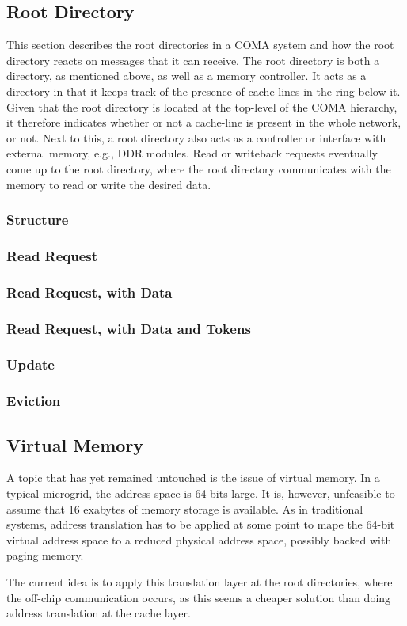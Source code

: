 \subsection{Root Directory}
This section describes the root directories in a COMA system and how the root directory reacts on messages that it can receive. The root directory is both a directory, as mentioned above, as well as a memory controller. It acts as a directory in that it keeps track of the presence of cache-lines in the ring below it. Given that the root directory is located at the top-level of the COMA hierarchy, it therefore indicates whether or not a cache-line is present in the whole network, or not. Next to this, a root directory also acts as a controller or interface with external memory, e.g., DDR modules. Read or writeback requests eventually come up to the root directory, where the root directory communicates with the memory to read or write the desired data.

\subsubsection{Structure}
\subsubsection{Read Request}
\subsubsection{Read Request, with Data}
\subsubsection{Read Request, with Data and Tokens}
\subsubsection{Update}
\subsubsection{Eviction}

\subsection{Virtual Memory}
A topic that has yet remained untouched is the issue of virtual memory. In a typical microgrid, the address space is 64-bits large. It is, however, unfeasible to assume that 16 exabytes of memory storage is available. As in traditional systems, address translation has to be applied at some point to mape the 64-bit virtual address space to a reduced physical address space, possibly backed with paging memory.

The current idea is to apply this translation layer at the root directories, where the off-chip communication occurs, as this seems a cheaper solution than doing address translation at the cache layer.
